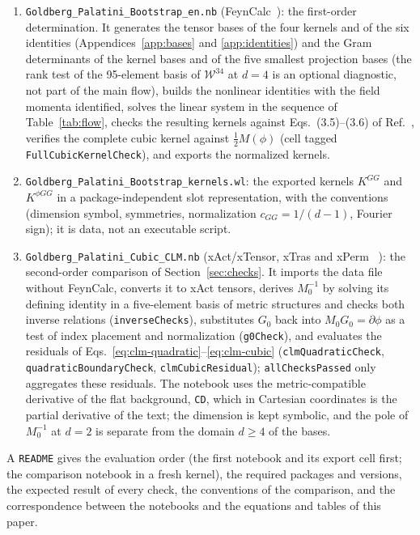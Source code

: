\documentclass[prd,aps,preprint,superscriptaddress,nofootinbib,amsmath,amssymb,eqsecnum]{revtex4-2}
\newcommand{\W}{\mathcal{W}}
\providecommand{\DIFaddtex}[1]{{\protect\color{blue} \sf #1}} %
\providecommand{\DIFdeltex}[1]{{\protect\color{red} \scriptsize #1}} %
\providecommand{\DIFaddbegin}{} %
\providecommand{\DIFaddend}{} %
\providecommand{\DIFdelbegin}{} %
\providecommand{\DIFdelend}{} %
\providecommand{\DIFadd}[1]{\texorpdfstring{\DIFaddtex{#1}}{#1}} %
\providecommand{\DIFdel}[1]{\texorpdfstring{\DIFdeltex{#1}}{}} %
\begin{document}
\begin{enumerate}
\item \texttt{Goldberg\_Palatini\_Bootstrap\_en.nb} (FeynCalc~\cite{FeynCalc}): the first-order
determination. It generates the tensor bases of the four kernels and of the six identities
(Appendices~\ref{app:bases} and \ref{app:identities}) and the Gram determinants of the kernel
bases and of the five smallest projection bases (the rank test of the 95-element basis of
$\W^{34}$ at $d=4$ is an optional diagnostic, not part of the main flow), builds the
nonlinear identities with the field momenta identified, solves the linear system in the sequence of
Table~\ref{tab:flow}, checks the resulting kernels against Eqs.~(3.5)--(3.6) of
Ref.~\cite{BrandtMcKeon2016}, verifies the complete cubic kernel against $\tfrac12M(\phi)$
(cell tagged \texttt{FullCubicKernelCheck}), and exports the normalized kernels.
\item \texttt{Goldberg\_Palatini\_Bootstrap\_kernels.wl}: the exported kernels $K^{GG}$ and
$K^{\phi GG}$ in a package-independent slot representation, with the conventions
(dimension symbol, symmetries, normalization $c_{GG}=1/(d-1)$, Fourier sign); it is data,
not an executable script.
\item \texttt{Goldberg\_Palatini\_Cubic\_CLM.nb} (xAct/xTensor, xTras and xPerm~\DIFdelbegin \DIFdel{\cite{xPerm}}\DIFdelend \DIFaddbegin \DIFadd{\cite{xAct,xPerm,xTras}}\DIFaddend ):
the second-order comparison of Section~\ref{sec:checks}. It imports the data file without
FeynCalc, converts it to xAct tensors, derives $M_0^{-1}$ by solving its defining identity in
a five-element basis of metric structures and checks both inverse relations
(\texttt{inverseChecks}), substitutes $G_0$ back into $M_0G_0=\partial\phi$ as a test of index
placement and normalization (\texttt{g0Check}), and evaluates the residuals of
Eqs.~\eqref{eq:clm-quadratic}--\eqref{eq:clm-cubic}
(\texttt{clmQuadraticCheck}, \texttt{quadraticBoundaryCheck}, \texttt{clmCubicResidual});
\texttt{allChecksPassed} only aggregates these residuals. The notebook uses the
metric-compatible derivative of the flat background, \texttt{CD}, which in Cartesian
coordinates is the partial derivative of the text; the dimension is kept symbolic, and the
pole of $M_0^{-1}$ at $d=2$ is separate from the domain $d\geq4$ of the bases.
\end{enumerate}
A \texttt{README} gives the evaluation order (the first notebook and its export cell first;
the comparison notebook in a fresh kernel), the required packages and versions, the expected
result of every check, the conventions of the comparison, and the correspondence between the
notebooks and the equations and tables of this paper.
\end{document}
